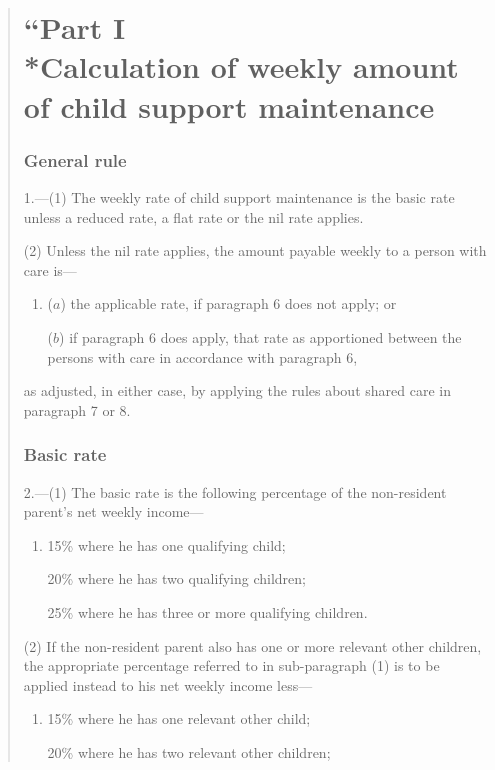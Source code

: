 \documentclass[12pt,a4paper]{article}
\begin{document}
\begin{quotation}
\part*{\noindent “Part I\\*Calculation of weekly amount of child support maintenance}

\section*{General rule}

1.---(1) The weekly rate of child support maintenance is the basic rate unless a reduced rate, a flat rate or the nil rate applies.

(2) Unless the nil rate applies, the amount payable weekly to a person with care is—
\begin{enumerate}\item[]
($a$) the applicable rate, if paragraph 6 does not apply; or

($b$) if paragraph 6 does apply, that rate as apportioned between the persons with care in accordance with paragraph 6,
\end{enumerate}
as adjusted, in either case, by applying the rules about shared care in paragraph 7 or 8. 

\section*{Basic rate}

2.---(1) The basic rate is the following percentage of the non-resident parent’s net weekly income—
\begin{enumerate}\item[]
    15\% where he has one qualifying child;

    20\% where he has two qualifying children;

    25\% where he has three or more qualifying children. 
\end{enumerate}

(2) If the non-resident parent also has one or more relevant other children, the appropriate percentage referred to in sub-paragraph (1)  is to be applied instead to his net weekly income less—
\begin{enumerate}\item[]
    15\% where he has one relevant other child;

    20\% where he has two relevant other children;


\end{enumerate}
\end{quotation}
\end{document}
